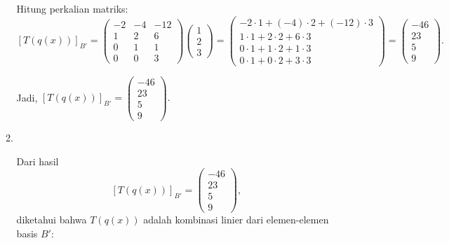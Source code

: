 \documentclass[11pt,letterpaper]{article}
\begin{document}
\begin{enumerate}
\begin{enumerate}
                Hitung perkalian matriks:
                \[
                  [T(q(x))]_{B'} =
                  \begin{pmatrix}
                    -2 & -4 & -12 \\
                    1  & 2  & 6   \\
                    0  & 1  & 1   \\
                    0  & 0  & 3
                  \end{pmatrix}
                  \begin{pmatrix}
                    1 \\ 2 \\ 3
                  \end{pmatrix}
                  =
                  \begin{pmatrix}
                    -2 \cdot 1 + (-4) \cdot 2 + (-12) \cdot 3 \\
                    1 \cdot 1 + 2 \cdot 2 + 6 \cdot 3         \\
                    0 \cdot 1 + 1 \cdot 2 + 1 \cdot 3         \\
                    0 \cdot 1 + 0 \cdot 2 + 3 \cdot 3
                  \end{pmatrix}
                  =
                  \begin{pmatrix}
                    -46 \\ 23 \\ 5 \\ 9
                  \end{pmatrix}.
                \]

                Jadi,
                $
                  [T(q(x))]_{B'} =
                  \begin{pmatrix}
                    -46 \\ 23 \\ 5 \\ 9
                  \end{pmatrix}.
                $
          \item \

                Dari hasil
                \[
                  [T(q(x))]_{B'} =
                  \begin{pmatrix}
                    -46 \\[4pt]
                    23  \\[4pt]
                    5   \\[4pt]
                    9
                  \end{pmatrix},
                \]
                diketahui bahwa $T(q(x))$ adalah kombinasi linier dari elemen-elemen basis $B'$:


\end{enumerate}
\end{enumerate}
\end{document}
